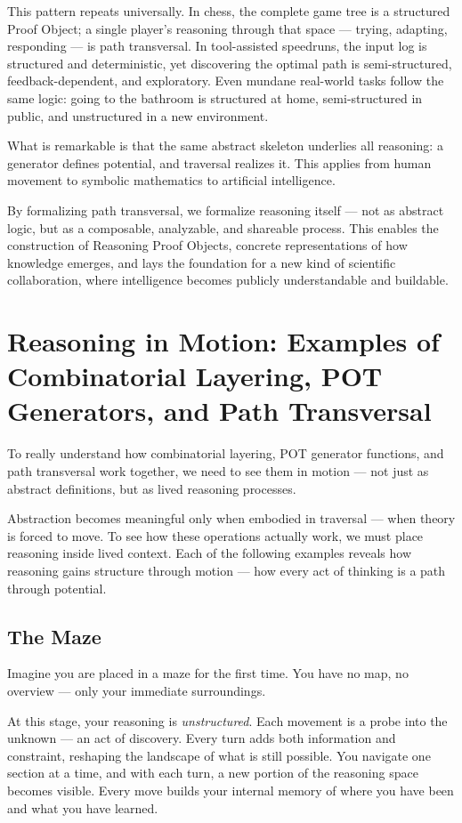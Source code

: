 \documentclass[11pt]{article}
\begin{document}
This pattern repeats universally. In chess, the complete game tree is a structured Proof Object; a single player's reasoning through that space --- trying, adapting, responding --- is path transversal. In tool-assisted speedruns, the input log is structured and deterministic, yet discovering the optimal path is semi-structured, feedback-dependent, and exploratory. Even mundane real-world tasks follow the same logic: going to the bathroom is structured at home, semi-structured in public, and unstructured in a new environment.

What is remarkable is that the same abstract skeleton underlies all reasoning: a generator defines potential, and traversal realizes it. This applies from human movement to symbolic mathematics to artificial intelligence.

By formalizing path transversal, we formalize reasoning itself --- not as abstract logic, but as a composable, analyzable, and shareable process. This enables the construction of Reasoning Proof Objects, concrete representations of how knowledge emerges, and lays the foundation for a new kind of scientific collaboration, where intelligence becomes publicly understandable and buildable.

\section{Reasoning in Motion: Examples of Combinatorial Layering, POT Generators, and Path Transversal}

To really understand how combinatorial layering, POT generator functions, and path transversal work together, we need to see them in motion --- not just as abstract definitions, but as lived reasoning processes.

Abstraction becomes meaningful only when embodied in traversal --- when theory is forced to move. To see how these operations actually work, we must place reasoning inside lived context. Each of the following examples reveals how reasoning gains structure through motion --- how every act of thinking is a path through potential.

\subsection{The Maze}

Imagine you are placed in a maze for the first time. You have no map, no overview --- only your immediate surroundings.

At this stage, your reasoning is \textit{unstructured}. Each movement is a probe into the unknown --- an act of discovery. Every turn adds both information and constraint, reshaping the landscape of what is still possible. You navigate one section at a time, and with each turn, a new portion of the reasoning space becomes visible. Every move builds your internal memory of where you have been and what you have learned.
\end{document}
